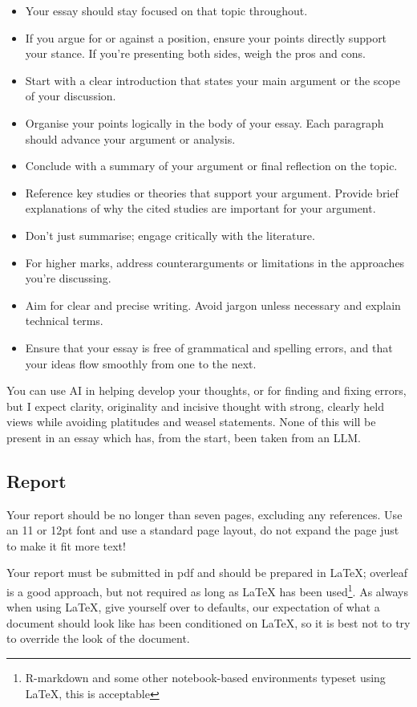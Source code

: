 \documentclass[12pt]{article}
\begin{document}
\begin{itemize}
\item Your essay should stay focused on that topic throughout. 
\item If you argue for or against a position, ensure your points directly support your stance. If you're presenting both sides, weigh the pros and cons.
\item Start with a clear introduction that states your main argument or the scope of your discussion.
\item Organise your points logically in the body of your essay. Each paragraph should advance your argument or analysis.
\item Conclude with a summary of your argument or final reflection on the topic.
\item Reference key studies or theories that support your argument. Provide brief explanations of why the cited studies are important for your argument.
\item  Don't just summarise; engage critically with the literature.
\item For higher marks, address counterarguments or limitations in the approaches you're discussing.
\item Aim for clear and precise writing. Avoid jargon unless necessary and explain technical terms.
\item Ensure that your essay is free of grammatical and spelling errors, and that your ideas flow smoothly from one to the next.
\end{itemize}

You can use AI in helping develop your thoughts, or for finding and
fixing errors, but I expect clarity, originality and incisive thought
with strong, clearly held views while avoiding platitudes and weasel
statements. None of this will be present in an essay which has, from
the start, been taken from an LLM.


\subsection*{Report}

Your report should be no longer than seven pages, excluding any
references. Use an 11 or 12pt font and use a standard page layout, do
not expand the page just to make it fit more text!

Your report must be submitted in pdf and should be prepared in LaTeX;
overleaf is a good approach, but not required as long as LaTeX has
been used\footnote{R-markdown and some other notebook-based
environments typeset using LaTeX, this is acceptable}. As always when
using LaTeX, give yourself over to defaults, our expectation of what a
document should look like has been conditioned on LaTeX, so it is best
not to try to override the look of the document.
\end{document}
